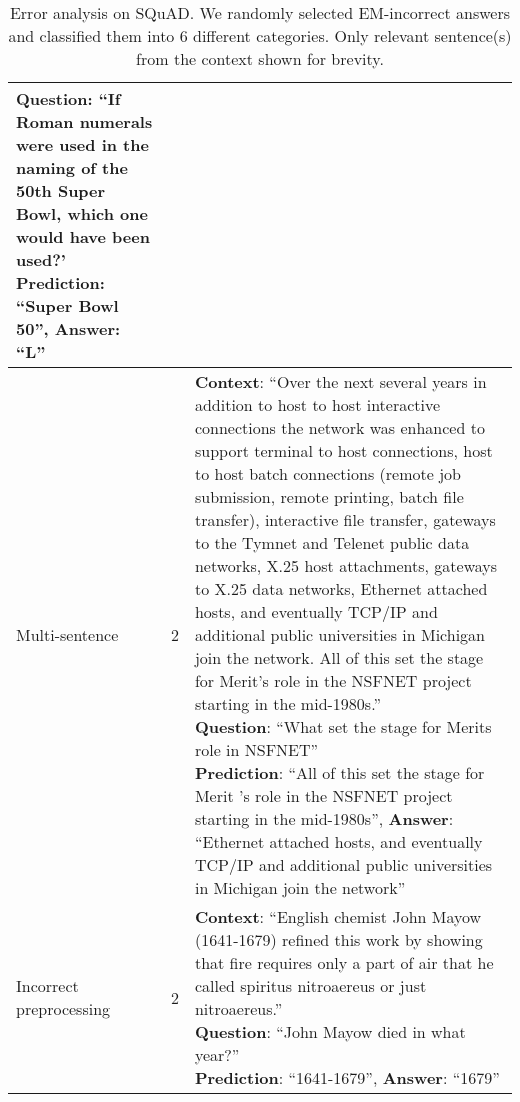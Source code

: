 \begin{table}[!htb]
\begin{tabular}{L{2cm} C{1.5cm} L{9.5cm}}
{        \textbf{Question}: ``If Roman numerals were used in the naming of the 50th Super Bowl, which one would have been used?'\\
        \textbf{Prediction}: ``Super Bowl 50'',
        \textbf{Answer}: ``L''\\}\\
        \hline
        Multi-sentence & 2 & \parbox[t]{9cm}{\textbf{Context}: ``Over the next several years in addition to host to host interactive connections the network was enhanced to support terminal to host connections, host to host batch connections (remote job submission, remote printing, batch file transfer), interactive file transfer, gateways to the Tymnet and Telenet public data networks, X.25 host attachments, gateways to X.25 data networks, Ethernet attached hosts, and eventually TCP/IP and additional public universities in Michigan join the network. All of this set the stage for Merit's role in the NSFNET project starting in the mid-1980s.''\\
        \textbf{Question}: ``What set the stage for Merits role in NSFNET''\\
        \textbf{Prediction}: ``All of this set the stage for Merit 's role in the NSFNET project starting in the mid-1980s'',
        \textbf{Answer}: ``Ethernet attached hosts, and eventually TCP/IP and additional public universities in Michigan join the network''\\}\\
        \hline
        Incorrect preprocessing & 2 & \parbox[t]{9cm}{\textbf{Context}: ``English chemist John Mayow (1641-1679) refined this work by showing that fire requires only a part of air that he called spiritus nitroaereus or just nitroaereus.''\\
        \textbf{Question}: ``John Mayow died in what year?''\\
        \textbf{Prediction}: ``1641-1679'',
        \textbf{Answer}: ``1679''}\\
        
    \end{tabular}
    \caption{Error analysis on SQuAD. We randomly selected EM-incorrect answers and classified them into 6 different categories.
    Only relevant sentence(s) from the context shown for brevity. }
    \label{tab:error}
\end{table}
